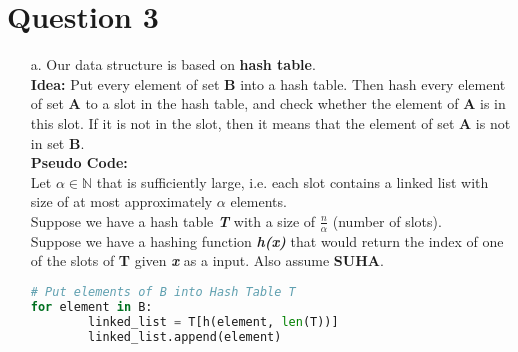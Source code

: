 \documentclass[10pt]{article}
\begin{document}
\section*{Question 3}
\begin{enumerate}
\item[a.] Our data structure is based on \textbf{hash table}.\\
\textbf{Idea:} Put every element of set \textbf{B} into a hash table. Then hash every element of set \textbf{A} to a
slot in the hash table, and check whether the element of \textbf{A} is in this slot. If it is not in the slot, then it means that the element of set \textbf{A} is not in set \textbf{B}.\\
\textbf{Pseudo Code:}\\
Let $\alpha\in\mathbb{N}$ that is sufficiently large, i.e. each slot contains a linked list with size of at most approximately $\alpha$ elements.\\
Suppose we have a hash table \textbf{\textit{T}} with a size of $\frac{n}{\alpha}$ (number of slots).\\
Suppose we have a hashing function \textit{\textbf{h(x)}} that would return the index of one of the slots of \textbf{T} given \textbf{\textit{x}} as a input. Also assume \textbf{SUHA}.
\begin{lstlisting}[language=Python]
# Put elements of B into Hash Table T
for element in B:
		linked_list = T[h(element, len(T))]
		linked_list.append(element)
		

\end{lstlisting}
\end{enumerate}
\end{document}

